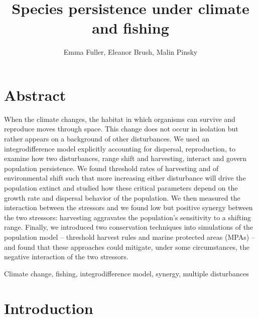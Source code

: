 \documentclass[12pt,english]{article}
\title{Species persistence under climate and fishing}
\author{Emma Fuller, Eleanor Brush, Malin Pinsky}
\date{}
\begin{document}
\maketitle


\section{Abstract}

When the climate changes, the habitat in which organisms can survive and reproduce moves through space. 
This change does not occur in isolation but rather appears on a background of other disturbances. We used an 
integrodifference model explicitly accounting for dispersal, reproduction, to examine how two disturbances, range shift and harvesting, interact and govern population persistence. We found threshold rates of harvesting and of environmental shift such that more increasing either disturbance will drive the population extinct and studied how these critical parameters depend on the growth rate and dispersal behavior of the population.  We then measured the interaction between the stressors and we found low but positive synergy between the two stressors: harvesting aggravates the population's sensitivity to a shifting range. Finally, we introduced two conservation techniques into simulations of the population model -- threshold harvest rules and marine protected areas (MPAs) -- and found that these approaches could mitigate, under some circumstances, the negative interaction of the two stressors.  
\hspace{10cm}

 Climate change, fishing, integrodifference model, synergy, multiple disturbances

\section{Introduction}
\end{document}
